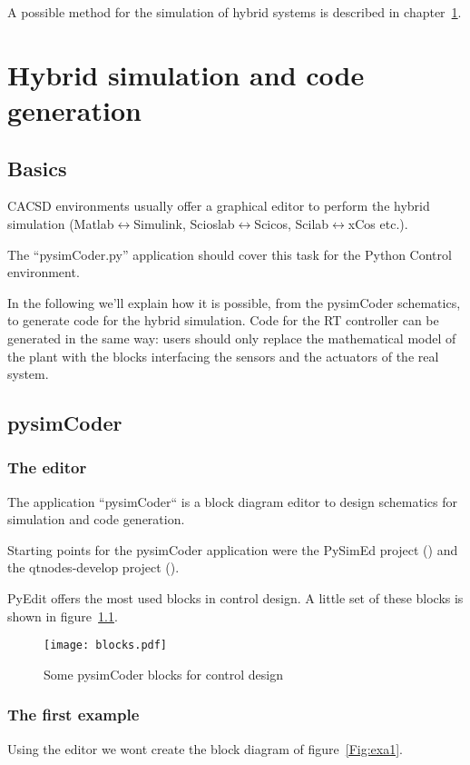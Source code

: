 A possible method for the simulation of hybrid systems is described in chapter~\ref{ch:hybsim}.

\chapter{Hybrid simulation and code generation}
\label{ch:hybsim}

\section{Basics}

CACSD environments usually offer a graphical 
editor to perform the hybrid simulation (Matlab$\leftrightarrow$Simulink, 
Scioslab$\leftrightarrow$Scicos, Scilab$\leftrightarrow$xCos etc.).

The ``pysimCoder.py'' application should cover this task for the Python Control 
environment.

In the following we'll explain how it is possible, from the pysimCoder schematics, 
to generate code for the hybrid simulation. Code for the RT controller can be 
generated in the same way: users should only replace the mathematical model 
of the plant with the blocks interfacing the sensors and the actuators of the 
real system.

\section{pysimCoder}

\subsection{The editor}

The application ``pysimCoder`` is a block diagram editor to design schematics for 
simulation and code generation.

Starting points for the pysimCoder application were the PySimEd project 
(\cite{PSE}) and the qtnodes-develop project (\cite{QTNODES}).

PyEdit offers the most used blocks in control design. A little set of these 
blocks is shown in figure~\ref{F17}.
 
 \begin{figure}[htbp]	%
 \centering
 \texttt{[image: blocks.pdf]}
 \caption{Some pysimCoder blocks for control design}
 \label{F17}
 \end{figure}
 
 \subsection{The first example}
 Using the editor we wont create the block diagram of figure~\ref{Fig:exa1}.
 
